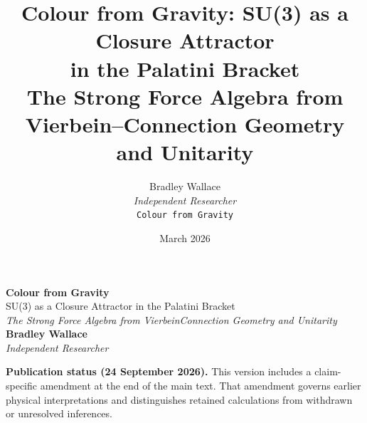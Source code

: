\documentclass[11pt,a4paper]{article}
\title{\textbf{Colour from Gravity: SU(3) as a Closure Attractor\\in the Palatini Bracket}\\[0.4em]
       \large The Strong Force Algebra from Vierbein--Connection Geometry and Unitarity}
\author{Bradley Wallace\\[0.3em]
        \small \textit{Independent Researcher}\\[0.2em]
        \small \texttt{Colour from Gravity}}
\date{March 2026}
\theoremstyle{plain}
\theoremstyle{definition}
\theoremstyle{remark}
\begin{document}
\begin{titlepage}
\thispagestyle{empty}

\noindent{\color{acsrule}\rule{\textwidth}{0.4pt}}
\vspace{6pt}
\vspace{6pt}
\noindent{\color{acsrule}\rule{\textwidth}{0.4pt}}

\vfill

\begin{center}
  {\Huge\bfseries\color{acsprimary} Colour from Gravity}\\[0.4em]
  {\Large\color{acsslate} SU(3) as a Closure Attractor in the Palatini Bracket}\\[1.2em]
  {\normalsize\itshape\color{acsslate}
    The Strong Force Algebra from Vierbein\textendash Connection Geometry and Unitarity}\\[2.0em]
  {\large\bfseries Bradley Wallace}\\[0.25em]
  {\small\itshape\color{acsslate} Independent Researcher}
\end{center}
\par\smallskip\noindent\textbf{Publication status (24 September 2026).}
This version includes a claim-specific amendment at the end of the main text.
That amendment governs earlier physical interpretations and distinguishes
retained calculations from withdrawn or unresolved inferences.\par\smallskip


\vspace{0.4in}


\end{titlepage}
\end{document}
